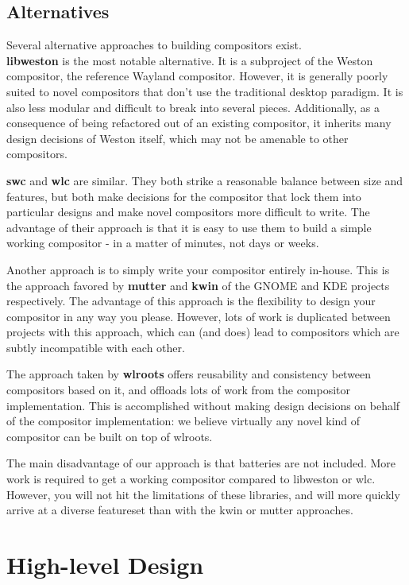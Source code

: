 \documentclass{article}
\begin{document}
\subsection{Alternatives}\label{alternatives}

Several alternative approaches to building compositors exist.\\

\textbf{libweston} is the most notable alternative. It is a subproject of the
Weston compositor, the reference Wayland compositor. However, it is generally
poorly suited to novel compositors that don't use the traditional desktop
paradigm. It is also less modular and difficult to break into several pieces.
Additionally, as a consequence of being refactored out of an existing
compositor, it inherits many design decisions of Weston itself, which may not be
amenable to other compositors.

\textbf{swc} and \textbf{wlc} are similar. They both strike a reasonable balance
between size and features, but both make decisions for the compositor that lock
them into particular designs and make novel compositors more difficult to
write. The advantage of their approach is that it is easy to use them to build a
simple working compositor - in a matter of minutes, not days or weeks.

Another approach is to simply write your compositor entirely in-house. This is
the approach favored by \textbf{mutter} and \textbf{kwin} of the GNOME and KDE
projects respectively. The advantage of this approach is the flexibility to
design your compositor in any way you please. However, lots of work is
duplicated between projects with this approach, which can (and does) lead to
compositors which are subtly incompatible with each other.

The approach taken by \textbf{wlroots} offers reusability and consistency
between compositors based on it, and offloads lots of work from the compositor
implementation. This is accomplished without making design decisions on behalf
of the compositor implementation: we believe virtually any novel kind of
compositor can be built on top of wlroots.

The main disadvantage of our approach is that batteries are not included. More
work is required to get a working compositor compared to libweston or wlc.
However, you will not hit the limitations of these libraries, and will more
quickly arrive at a diverse featureset than with the kwin or mutter approaches.

\section{High-level Design}\label{highlevel}
\end{document}

